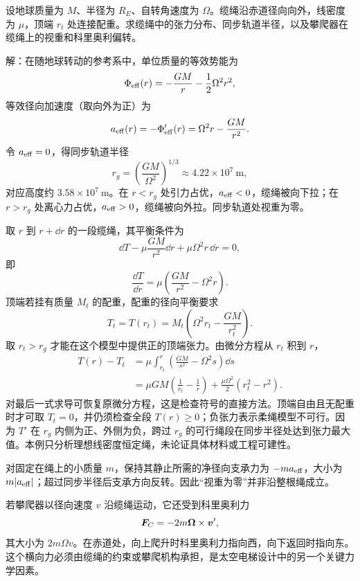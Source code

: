 \begin{example}[太空电梯的张力与视重]
设地球质量为 $M$、半径为 $R_E$、自转角速度为 $\Omega$。缆绳沿赤道径向向外，线密度为 $\mu$，顶端 $r_t$ 处连接配重。求缆绳中的张力分布、同步轨道半径，以及攀爬器在缆绳上的视重和科里奥利偏转。

\begin{center}
\end{center}

解：在随地球转动的参考系中，单位质量的等效势能为
\[
\Phi_{\rm eff}(r)=-\frac{GM}{r}-\frac12\Omega^2r^2,
\]
等效径向加速度（取向外为正）为
\[
a_{\rm eff}(r)=-\Phi_{\rm eff}'(r)=\Omega^2r-\frac{GM}{r^2}.
\]
令 $a_{\rm eff}=0$，得同步轨道半径
\[
r_g=\left(\frac{GM}{\Omega^2}\right)^{1/3}
\approx4.22\times10^7\ \mathrm{m},
\]
对应高度约 $3.58\times10^7\ \mathrm{m}$。在 $r<r_g$ 处引力占优，$a_{\rm eff}<0$，缆绳被向下拉；在 $r>r_g$ 处离心力占优，$a_{\rm eff}>0$，缆绳被向外拉。同步轨道处视重为零。

取 $r$ 到 $r+\dd r$ 的一段缆绳，其平衡条件为
\[
\dd T-\mu\frac{GM}{r^2}\dd r+\mu\Omega^2r\,\dd r=0,
\]
即
\[
\frac{\dd T}{\dd r}
=\mu\left(\frac{GM}{r^2}-\Omega^2r\right).
\]
顶端若挂有质量 $M_t$ 的配重，配重的径向平衡要求
\[
T_t=T(r_t)=M_t\left(\Omega^2r_t-\frac{GM}{r_t^2}\right).
\]
取 $r_t>r_g$ 才能在这个模型中提供正的顶端张力。由微分方程从 $r_t$ 积到 $r$，
\begin{align}
T(r)-T_t
&=\mu\int_{r_t}^{r}\left(\frac{GM}{s^2}-\Omega^2s\right)\dd s\\
&=\mu GM\left(\frac1{r_t}-\frac1r\right)
+\frac{\mu\Omega^2}{2}(r_t^2-r^2).
\end{align}
对最后一式求导可恢复原微分方程，这是检查符号的直接方法。顶端自由且无配重时才可取 $T_t=0$，并仍须检查全段 $T(r)\ge0$；负张力表示柔绳模型不可行。因为 $T'$ 在 $r_g$ 内侧为正、外侧为负，跨过 $r_g$ 的可行绳段在同步半径处达到张力最大值。本例只分析理想线密度恒定绳，未论证具体材料或工程可建性。

对固定在绳上的小质量 $m$，保持其静止所需的净径向支承力为 $-ma_{\rm eff}$，大小为 $m|a_{\rm eff}|$；超过同步半径后支承方向反转。因此“视重为零”并非沿整根绳成立。

若攀爬器以径向速度 $v$ 沿缆绳运动，它还受到科里奥利力
\[
\boldsymbol{F}_C=-2m\boldsymbol{\Omega}\times\boldsymbol{v}',
\]
其大小为 $2m\Omega v$。在赤道处，向上爬升时科里奥利力指向西，向下返回时指向东。这个横向力必须由缆绳的约束或攀爬机构承担，是太空电梯设计中的另一个关键力学因素。
\end{example}

